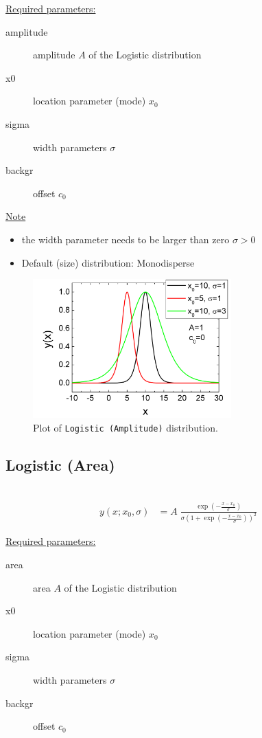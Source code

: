 \underline{Required parameters:}
\begin{description}
    \item[amplitude] amplitude $A$ of the Logistic distribution
    \item[x0] location parameter (mode) $x_0$
    \item[sigma] width parameters $\sigma$
    \item[backgr] offset $c_0$
\end{description}

\underline{Note}
\begin{itemize}
  \item the width parameter needs to be larger than zero $\sigma > 0$
  \item Default (size) distribution: Monodisperse
\end{itemize}

\begin{figure}[htb]
\begin{center}
\includegraphics[width=0.6824\textwidth]{LogisticAmplitude.png}
\end{center}
\caption{Plot of \texttt{Logistic (Amplitude)} distribution.}
\label{fig:LogisticAmplitude}
\end{figure}

\clearpage
\subsection{Logistic (Area)} ~\\
\label{sec:LogisticArea}
\begin{align}
y(x; x_0,\sigma) &= A\; \frac{\exp\left(-\frac{x-x_0}{\sigma}\right)} {\sigma\left(1+\exp\left(-\frac{x-x_0}{\sigma}\right)\right)^2}
\end{align}

\underline{Required parameters:}
\begin{description}
    \item[area] area $A$ of the Logistic distribution
    \item[x0] location parameter (mode) $x_0$
    \item[sigma] width parameters $\sigma$
    \item[backgr] offset $c_0$
\end{description}

